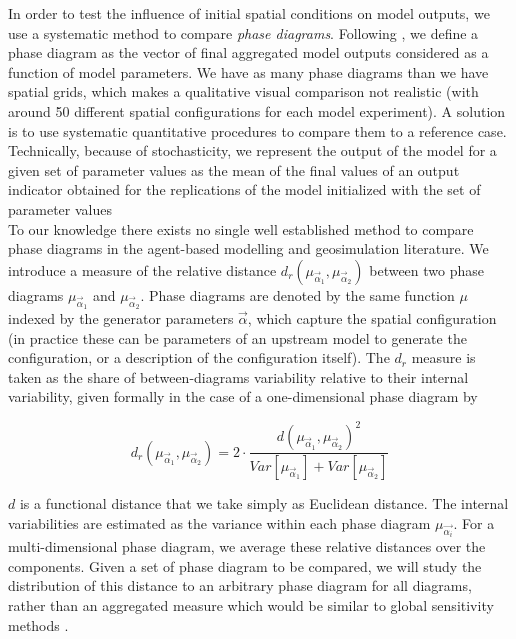 \documentclass{JASSS}
\begin{document}
In order to test the influence of initial spatial conditions on model outputs, we use a systematic method to compare \emph{phase diagrams}. Following \citet{Gauvinetal2009}, we define a phase diagram as the vector of final aggregated model outputs considered as a function of model parameters. We have as many phase diagrams than we have spatial grids, which makes a qualitative visual comparison not realistic (with around 50 different spatial configurations for each model experiment). A solution is to use systematic quantitative procedures to compare them to a reference case. Technically, because of stochasticity, we represent the output of the model for a given set of parameter values as the mean of the final values of an output indicator obtained for the replications of the model initialized with the set of parameter values \\
To our knowledge there exists no single well established method to compare phase diagrams in the agent-based modelling and geosimulation literature. We introduce a measure of the relative distance $d_r(\mu_{\vec{\alpha}_1},\mu_{\vec{\alpha}_2})$ between two phase diagrams $\mu_{\vec{\alpha}_1}$ and $\mu_{\vec{\alpha}_2}$. Phase diagrams are denoted by the same function $\mu$ indexed by the generator parameters $\vec{\alpha}$, which capture the spatial configuration (in practice these can be parameters of an upstream model to generate the configuration, or a description of the configuration itself). The $d_r$ measure is taken as the share of between-diagrams variability relative to their internal variability, given formally in the case of a one-dimensional phase diagram by


\begin{equation}\label{eq:phase-distance}
d_r\left(\mu_{\vec{\alpha}_1},\mu_{\vec{\alpha}_2}\right) = 2 \cdot \frac{d(\mu_{\vec{\alpha}_1},\mu_{\vec{\alpha}_2})^2}{Var\left[\mu_{\vec{\alpha}_1}\right] + Var\left[\mu_{\vec{\alpha}_2}\right]}
\end{equation}

$d$ is a functional distance that we take simply as Euclidean distance. The internal variabilities are estimated as the variance within each phase diagram $\mu_{\vec{\alpha_i}}$. For a multi-dimensional phase diagram, we average these relative distances over the components. Given a set of phase diagram to be compared, we will study the distribution of this distance to an arbitrary phase diagram for all diagrams, rather than an aggregated measure which would be similar to global sensitivity methods \citep{saltelli2008global}.
\end{document}
